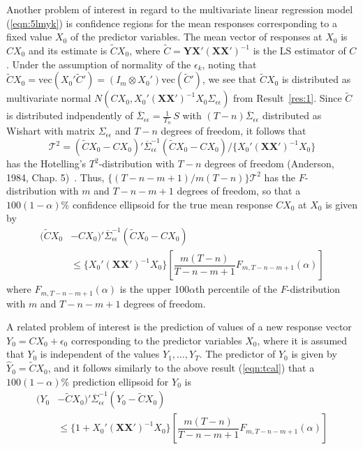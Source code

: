 Another problem of interest in regard to the multivariate linear regression model (\ref{eqn:5lmyk})
is confidence regions for the mean responses corresponding to a fixed value $X_0$ of the predictor variables. The mean vector of responses at $X_0$ is $CX_0$ and its estimate is $\tilde{C}X_0$, where $\tilde{C}=\mathbf{Y}\mathbf{X}'(\mathbf{X}\mathbf{X}')^{-1}$ is the LS estimator of $C$. Under the assumption of normality of the $\epsilon_k$, noting that $\tilde{C}X_0=\text{vec}(X_0'\tilde{C}')=(I_m \otimes X_0') \text{vec}(\tilde{C}')$, we see that $\tilde{C}X_0$ is distributed as multivariate normal $N(CX_0,X_0' (\mathbf{X}\mathbf{X}')^{-1}X_0 \Sigma_{\epsilon\epsilon})$ from Result~\ref{res:1}. Since $\tilde{C}$ is distributed indpendently of $\overline{\Sigma}_{\epsilon\epsilon}= \frac{1}{T_n}\,S$ with $(T-n) \overline{\Sigma}_{\epsilon\epsilon}$ distributed as Wishart with matrix $\Sigma_{\epsilon\epsilon}$ and $T-n$ degrees of freedom, it follows that
	\begin{equation}\label{eqn:tcal}
	\mathcal{T}^2=(\tilde{C}X_0-CX_0)' \overline{\Sigma}_{\epsilon\epsilon}^{-1} (\tilde{C}X_0-CX_0)/\{X_0'(\mathbf{X}\mathbf{X}')^{-1}X_0\}
	\end{equation}
has the Hotelling's $T^2$-distribution with $T-n$ degrees of freedom (Anderson, 1984, Chap. 5)~\cite{andersontw2}. Thus, $\{(T-n-m+1)/m(T-n)\}\mathcal{T}^2$ has the $F$-distribution with $m$ and $T-n-m+1$ degrees of freedom, so that a $100(1-\alpha)\%$ confidence ellipsoid for the true mean response $CX_0$ at $X_0$ is given by 
	\begin{equation}\label{eqn:52line}
	\begin{split}
	(\tilde{C}X_0 &-CX_0)' \overline{\Sigma}_{\epsilon\epsilon}^{-1}(\tilde{C}X_0-CX_0) \\
	 &\leq \{X_0' (\mathbf{X}\mathbf{X}')^{-1}X_0\} \left[ \dfrac{m(T-n)}{T-n-m+1} F_{m,T-n-m+1}(\alpha) \right]
	 \end{split}
	\end{equation}
where $F_{m,T-n-m+1}(\alpha)$ is the upper 100$\alpha$th percentile of the $F$-distribution with $m$ and $T-n-m+1$ degrees of freedom. 


A related problem of interest is the prediction of values of a new response vector $Y_0=CX_0+\epsilon_0$ corresponding to the predictor variables $X_0$, where it is assumed that $Y_0$ is independent of the values $Y_1,\ldots,Y_T$. The predictor of $Y_0$ is given by $\hat{Y}_0=\tilde{C}X_0$, and it follows similarly to the above result (\ref{eqn:tcal}) that a $100(1-\alpha)\%$ prediction ellipsoid for $Y_0$ is
	\begin{equation}\label{eqn:52another2}
	\begin{split}
	(Y_0 &-\tilde{C}X_0)' \overline{\Sigma}_{\epsilon\epsilon}^{-1}(Y_0-\tilde{C}X_0) \\
	&\leq\{1+X_0'(\mathbf{X}\mathbf{X}')^{-1} X_0\} \left[ \dfrac{m(T-n)}{T-n-m+1} F_{m,T-n-m+1}(\alpha) \right]
	\end{split}
	\end{equation}


